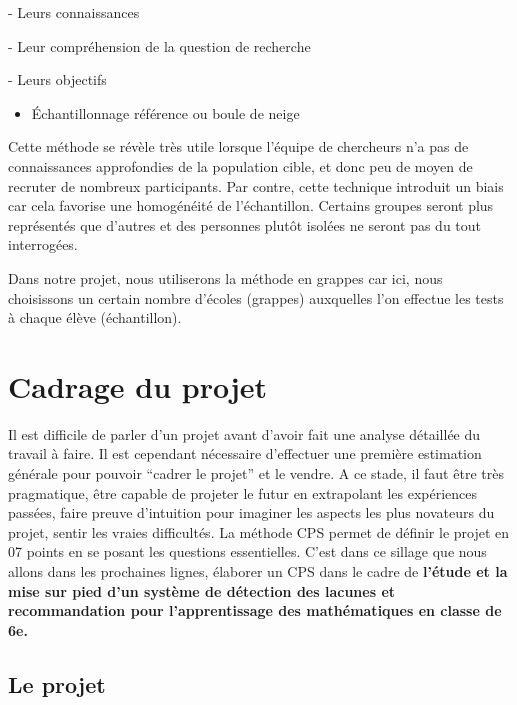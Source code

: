 \noindent

- Leurs connaissances 

\noindent

	- Leur compréhension de la question de recherche 

\noindent

	- Leurs objectifs 

	\begin{itemize}
		\item	Échantillonnage référence ou boule de neige   
	\end{itemize}
	Cette méthode se révèle très utile lorsque l’équipe de chercheurs n’a pas de connaissances approfondies de la population cible, et donc peu de moyen de recruter de nombreux participants. Par contre, cette technique introduit un biais car cela favorise une homogénéité de l’échantillon. Certains groupes seront plus représentés que d’autres et des personnes plutôt isolées ne seront pas du tout interrogées.\\

\noindent

	Dans notre projet, nous utiliserons la méthode en grappes car ici, nous choisissons un certain nombre d’écoles (grappes) auxquelles l’on effectue les tests à chaque élève (échantillon). 
	
\section{Cadrage du projet}
	
	Il est difficile de parler d’un projet avant d’avoir fait une analyse détaillée du travail à faire. Il est cependant nécessaire d’effectuer une première estimation générale pour pouvoir “cadrer le projet” et le vendre. A ce stade, il faut être très pragmatique, être capable de projeter le futur en extrapolant les expériences passées, faire preuve d’intuition pour imaginer les aspects les plus novateurs du projet, sentir les vraies difficultés. La méthode CPS permet de définir le projet en 07 points en se posant les questions essentielles. C’est dans ce sillage que nous allons dans les prochaines lignes, élaborer un CPS dans le cadre de \textbf{ l’étude et la mise sur pied d’un système de détection des lacunes et recommandation pour l’apprentissage des mathématiques en classe de 6e.}
	
\subsection{Le projet }
